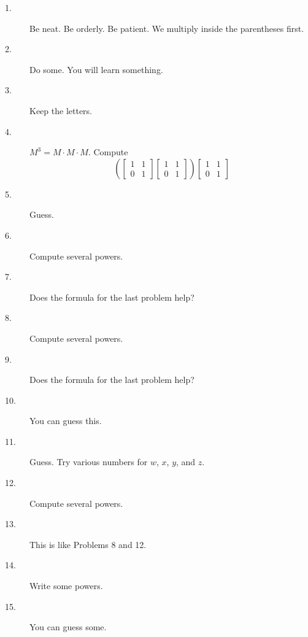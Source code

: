 \documentclass{article}
\begin{document}
\begin{description}

  \item[1.] Be neat. Be orderly. Be patient. We multiply inside the parentheses first. 

  \item[2.] Do some. You will learn something.

  \item[3.] Keep the letters. 

  \item[4.] $M^3 = M \cdot M \cdot M$. Compute
    \begin{equation*}
      \left( 
      \begin{bmatrix} 1 & 1 \\ 0 & 1 \end{bmatrix}
      \begin{bmatrix} 1 & 1 \\ 0 & 1 \end{bmatrix} 
      \right)
      \begin{bmatrix} 1 & 1 \\ 0 & 1 \end{bmatrix}
    \end{equation*}

  \item[5.] Guess. 

  \item[6.] Compute several powers. 

  \item[7.] Does the formula for the last problem help?

  \item[8.] Compute several powers. 

  \item[9.] Does the formula for the last problem help?

  \item[10.] You can guess this. 

  \item[11.] Guess. Try various numbers for $w$, $x$, $y$, and $z$.

  \item[12.] Compute several powers.

  \item[13.] This is like Problems 8 and 12.

  \item[14.] Write some powers. 

  \item[15.] You can guess some.


\end{description}
\end{document}
